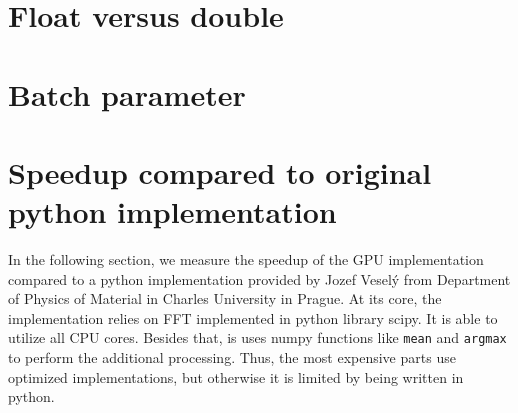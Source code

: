 \section{Float versus double}


\section{Batch parameter}
\label{batch-param-eval}




\section{Speedup compared to original python implementation}

In the following section, we measure the speedup of the GPU implementation compared to a python implementation provided by Jozef Veselý from Department of Physics of Material in Charles University in Prague. At its core, the implementation relies on FFT implemented in python library scipy. It is able to utilize all CPU cores. Besides that, is uses numpy functions like \texttt{mean} and \texttt{argmax} to perform the additional processing. Thus, the most expensive parts use optimized implementations, but otherwise it is limited by being written in python.

